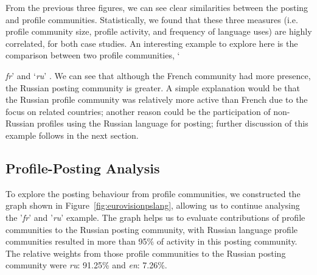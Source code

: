 \documentclass{llncs}
\begin{document}

From the previous three figures, we can see clear similarities between
the posting and profile communities. Statistically, we found that
these three measures (i.e. profile community size, profile activity,
and frequency of language uses) are highly correlated, for both case
studies. An interesting example to explore here is the comparison
between two profile communities, `{\emph{fr}' and `{\emph{ru}}' .  We
can see that although the French community had more presence, the
Russian posting community is greater. A simple explanation would be
that the Russian profile community was relatively more active than
French due to the focus on related countries; another reason could be
the participation of non-Russian profiles using the Russian language
for posting; further discussion of this example follows in the next
section.


\subsection{Profile-Posting Analysis}\label{eurovisionppanalysis}

To explore the posting behaviour from profile communities, we
constructed the graph shown in Figure~\ref{fig:eurovisionpslang},
allowing us to continue analysing the '{\emph{fr}}' and '{\emph{ru}}'
example.  The graph helps us to evaluate contributions of profile
communities to the Russian posting community, with Russian language
profile communities resulted in more than 95\% of activity in this
posting community. The relative weights from those profile communities
to the Russian posting community were {\emph{ru}}: 91.25\% and
{\emph{en}}: 7.26\%.


}
\end{document}
